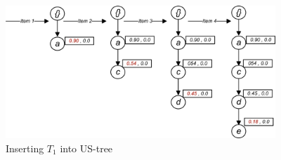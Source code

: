 %
%
\begin{figure}
  \centering
	\includegraphics[width=.8\textwidth,height=5cm]{images/sim_01.jpg}  
	\caption{Inserting $T_1$ into US-tree}
	\label{figure:t1}
\end{figure}

